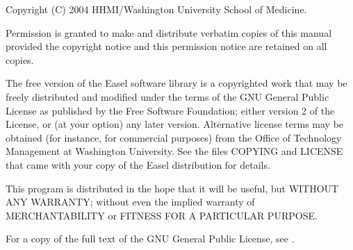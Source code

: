 \vspace*{\fill}
\begin{flushleft}
Copyright (C) 2004 HHMI/Washington University School of Medicine.\vspace{5mm}

Permission is granted to make and distribute verbatim copies of this
manual provided the copyright notice and this permission notice are
retained on all copies.\vspace{5mm}

The free version of the Easel software library is a copyrighted work
that may be freely distributed and modified under the terms of the GNU
General Public License as published by the Free Software Foundation;
either version 2 of the License, or (at your option) any later
version. Alternative license terms may be obtained (for instance, for
commercial purposes) from the Office of Technology Management at
Washington University. See the files COPYING and LICENSE that came
with your copy of the Easel distribution for details.\vspace{5mm}

This program is distributed in the hope that it will be useful, but
WITHOUT ANY WARRANTY; without even the implied warranty of
MERCHANTABILITY or FITNESS FOR A PARTICULAR PURPOSE.\vspace{5mm}

For a copy of the full text of the GNU General Public License, see
.
\vspace{5mm}
\end{flushleft}

